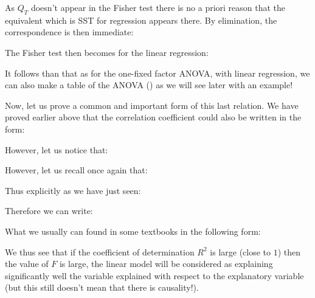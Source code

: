 	As $Q_T$ doesn't appear in the Fisher test there is no a priori reason that the equivalent which is SST for regression appears there. By elimination, the correspondence is then immediate:
	
	The Fisher test then becomes for the linear regression:
	
	It follows than that as for the one-fixed factor ANOVA, with linear regression, we can also make a table of the ANOVA () as we will see later with an example!
	
	Now, let us prove a common and important form of this last relation. We have proved earlier above that the correlation coefficient could also be written in the form:
	
	However, let us notice that:
	
	However, let us recall once again that:
	
 	Thus explicitly as we have just seen:
	
	Therefore we can write:
	
	What we usually can found in some textbooks in the following form:
	
	We thus see that if the coefficient of determination $R^2$ is large (close to $1$) then the value of $F$ is large, the linear model will be considered as explaining significantly well the variable explained with respect to the explanatory variable (but this still doesn't mean that there is causality!).
	
